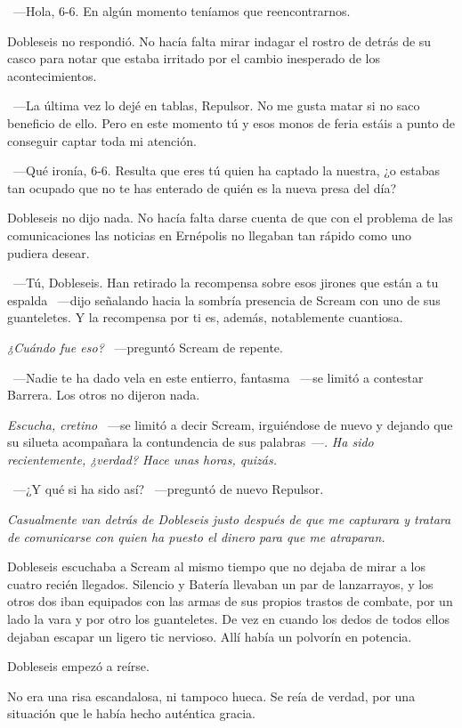 ~---Hola, 6-6. En algún momento teníamos que reencontrarnos.

Dobleseis no respondió. No hacía falta mirar indagar el rostro de detrás de su casco para notar que estaba irritado por el cambio inesperado de los acontecimientos.

~---La última vez lo dejé en tablas, Repulsor. No me gusta matar si no saco beneficio de ello. Pero en este momento tú y esos monos de feria estáis a punto de conseguir captar toda mi atención.

~---Qué ironía, 6-6. Resulta que eres tú quien ha captado la nuestra, ¿o estabas tan ocupado que no te has enterado de quién es la nueva presa del día?

Dobleseis no dijo nada. No hacía falta darse cuenta de que con el problema de las comunicaciones las noticias en Ernépolis no llegaban tan rápido como uno pudiera desear.

~---Tú, Dobleseis. Han retirado la recompensa sobre esos jirones que están a tu espalda ~---dijo señalando hacia la sombría presencia de Scream con uno de sus guanteletes. Y la recompensa por ti es, además, notablemente cuantiosa.

\emph{¿Cuándo fue eso?} ~---preguntó Scream de repente.

~---Nadie te ha dado vela en este entierro, fantasma ~---se limitó a contestar Barrera. Los otros no dijeron nada.

\emph{Escucha, cretino} ~---se limitó a decir Scream, irguiéndose de nuevo y dejando que su silueta acompañara la contundencia de sus palabras~---. \emph{Ha sido recientemente, ¿verdad? Hace unas horas, quizás.}

~---¿Y qué si ha sido así? ~---preguntó de nuevo Repulsor.

\emph{Casualmente van detrás de Dobleseis justo después de que me capturara y tratara de comunicarse con quien ha puesto el dinero para que me atraparan.}

Dobleseis escuchaba a Scream al mismo tiempo que no dejaba de mirar a los cuatro recién llegados. Silencio y Batería llevaban un par de lanzarrayos, y los otros dos iban equipados con las armas de sus propios trastos de combate, por un lado la vara y por otro los guanteletes. De vez en cuando los dedos de todos ellos dejaban escapar un ligero tic nervioso. Allí había un polvorín en potencia.

Dobleseis empezó a reírse.

No era una risa escandalosa, ni tampoco hueca. Se reía de verdad, por una situación que le había hecho auténtica gracia.


